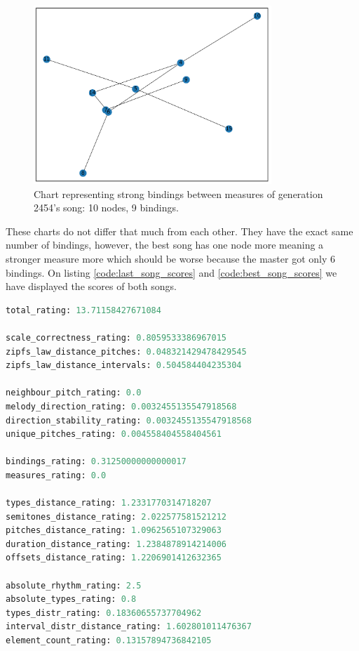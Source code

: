 \documentclass[a4paper]{article}
\begin{document}
\begin{figure}[H]
	\begin{center}
	\includegraphics[width=0.8\textwidth]{Fotos/results/gf/strong_graph_best.png}
	\end{center}
	\caption{Chart representing strong bindings between measures of generation 2454's song: 10 nodes, 9 bindings.}
	\label{fig:strong_graph_best}
\end{figure}


These charts do not differ that much from each other. They have the exact same number of bindings, however, the best song has one node more meaning a stronger measure more which should be worse because the master got only 6 bindings. On listing \ref{code:last_song_scores} and \ref{code:best_song_scores} we have displayed the scores of both songs.

\begin{lstlisting}[language=Python,caption={Last gen song's ratings.},captionpos=b,label=code:last_song_scores]
total_rating: 13.71158427671084

scale_correctness_rating: 0.8059533386967015
zipfs_law_distance_pitches: 0.048321429478429545
zipfs_law_distance_intervals: 0.504584404235304

neighbour_pitch_rating: 0.0
melody_direction_rating: 0.0032455135547918568
direction_stability_rating: 0.0032455135547918568
unique_pitches_rating: 0.004558404558404561

bindings_rating: 0.31250000000000017
measures_rating: 0.0

types_distance_rating: 1.2331770314718207
semitones_distance_rating: 2.022577581521212
pitches_distance_rating: 1.0962565107329063
duration_distance_rating: 1.2384878914214006
offsets_distance_rating: 1.2206901412632365

absolute_rhythm_rating: 2.5
absolute_types_rating: 0.8
types_distr_rating: 0.18360655737704962
interval_distr_distance_rating: 1.602801011476367
element_count_rating: 0.13157894736842105
\end{lstlisting}
\end{document}
